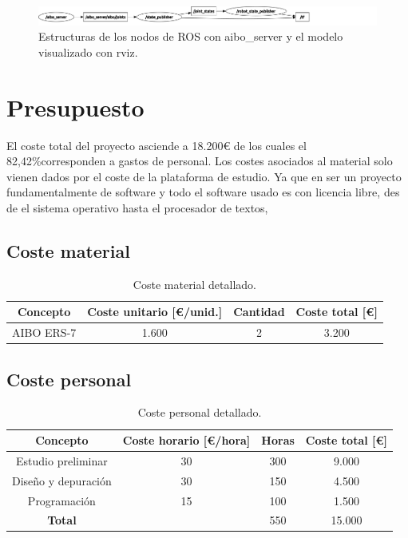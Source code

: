 \documentclass[12pt,a4paper,final,twoside]{book}
\begin{document}
\begin{figure}[H]
	\centering
    \includegraphics[scale=0.26]{images/graphModel.pdf}
	 \caption{Estructuras de los nodos de ROS con aibo{\_}server y el modelo visualizado con rviz.}
  \label{fig:aibostack}
\end{figure}
\newpage

\chapter{Presupuesto}
\thispagestyle{fancy}
El coste total del proyecto asciende a 18.200{\euro} de los cuales el 82,42{\%}corresponden a gastos de personal. Los costes asociados al material solo vienen dados por el coste de la plataforma de estudio. Ya que en ser un proyecto fundamentalmente de software y todo el software usado es con licencia libre, des de el sistema operativo hasta el procesador de textos, 

\section{Coste material}

\begin{table}[H]
\begin{center}
\begin{tabulary}{\textwidth}{|C|C|C|C|}
\hline
\textbf{Concepto}&\textbf{Coste unitario [{\euro}/unid.]} & \textbf{Cantidad} & \textbf{Coste total [\euro]} \\ \hline
AIBO ERS-7 & 1.600& 2& 3.200 \\ \hline

\end{tabulary}
\end{center}
\caption{Coste material detallado.\label{costmat}}
\end{table}
\section{Coste personal}
\begin{table}[H]
\begin{center}
\begin{tabulary}{\textwidth}{|C|C|C|C|}
\hline
\textbf{Concepto}&\textbf{Coste horario [{\euro}/hora]} & \textbf{Horas} & \textbf{Coste total [\euro]} \\ \hline
Estudio preliminar & 30& 300& 9.000 \\ \hline
Diseño y depuración & 30& 150& 4.500 \\ \hline
Programación& 15& 100& 1.500 \\ \hline
\textbf{Total}& & 550& 15.000 \\ \hline
\end{tabulary}
\end{center}
\caption{Coste personal detallado.\label{costper}}
\end{table}
\end{document}
